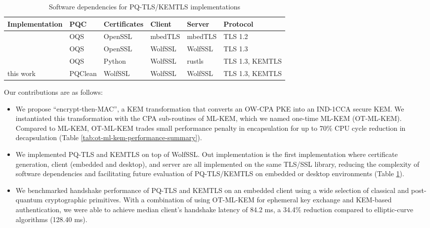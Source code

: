 \documentclass[letterpaper,12pt,titlepage,oneside,final]{book}
\begin{document}
\begin{table}[htbp]
    \centering\footnotesize
    \begin{tabular}{llllll}
    \toprule
        {\bf Implementation} & {\bf PQC} & {\bf Certificates} & {\bf Client} & {\bf Server} & {\bf Protocol} \\
    \midrule
        \cite{DBLP:conf/ccs/Burstinghaus-Steinbach20,DBLP:journals/iacr/Burstinghaus-Steinbach20}
        & OQS & OpenSSL & mbedTLS & mbedTLS & TLS 1.2 \\
        \cite{DBLP:conf/ispec/GeorgeLFZSS22}
        & OQS & OpenSSL & WolfSSL & WolfSSL & TLS 1.3 \\
        \cite{DBLP:conf/space/GonzalezW22}
        & OQS & Python & WolfSSL & rustls & TLS 1.3, KEMTLS \\
        this work & PQClean & WolfSSL & WolfSSL & WolfSSL & TLS 1.3, KEMTLS \\
    \bottomrule
    \end{tabular}
    \caption{Software dependencies for PQ-TLS/KEMTLS implementations}
    \label{tab:tls-impl-dependencies}
\end{table}

Our contributions are as follows: \begin{itemize}
    \item We propose ``encrypt-then-MAC'', a KEM transformation that converts an OW-CPA PKE into an IND-1CCA secure KEM.
    We instantiated this transformation with the CPA sub-routines of ML-KEM, which we named one-time ML-KEM (OT-ML-KEM).
    Compared to ML-KEM, OT-ML-KEM trades small performance penalty in encapsulation for up to 70\% CPU cycle reduction in decapsulation (Table \ref{tab:ot-ml-kem-performance-summary}).
    \item We implemented PQ-TLS and KEMTLS on top of WolfSSL.
    Out implementation is the first implementation where certificate generation, client (embedded and desktop), and server are all implemented on the same TLS/SSL library, reducing the complexity of software dependencies and facilitating future evaluation of PQ-TLS/KEMTLS on embedded or desktop environments (Table \ref{tab:tls-impl-dependencies}).
    \item We benchmarked handshake performance of PQ-TLS and KEMTLS on an embedded client using a wide selection of classical and post-quantum cryptographic primitives.
    With a combination of using OT-ML-KEM for ephemeral key exchange and KEM-based authentication, we were able to achieve median client's handshake latency of 84.2 ms, a 34.4\% reduction compared to elliptic-curve algorithms (128.40 ms).
\end{itemize}
\end{document}

